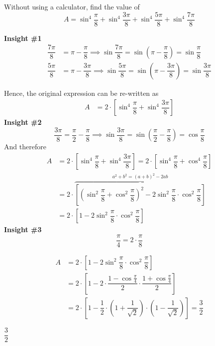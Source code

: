 
\question[4] Without using a calculator, find the value of 
\[ A = \sin^4\dfrac{\pi}{8} + \sin^4\dfrac{3\pi}{8} + \sin^4\dfrac{5\pi}{8} + \sin^4\dfrac{7\pi}{8} \]

\begin{solution}[\fullpage]
    \textbf{Insight \#1}
    \begin{align}
      \dfrac{7\pi}{8} &= \pi-\dfrac\pi{8} \implies\sin\dfrac{7\pi}{8}=\sin\left(\pi-\dfrac\pi{8} \right) = \sin\dfrac\pi{8} \\
      \dfrac{5\pi}{8} &= \pi-\dfrac{3\pi}{8} \implies\sin\dfrac{5\pi}{8}=\sin\left(\pi-\dfrac{3\pi}{8} \right) = \sin\dfrac{3\pi}{8}
    \end{align}

    Hence, the original expression can be re-written as 
    \begin{align}
      A &= 2\cdot\left[ \sin^4\dfrac\pi{8} + \sin^4\dfrac{3\pi}{8} \right] 
    \end{align}
    \textbf{Insight \#2}
    \[ \dfrac{3\pi}{8} = \dfrac\pi{2} - \dfrac\pi{8} \implies \sin\dfrac{3\pi}{8} = \sin\left(\dfrac\pi{2}-\dfrac\pi{8} \right) = \cos\dfrac\pi{8} \]
    And therefore
    \begin{align}
      A &= 2\cdot\left[ \sin^4\dfrac\pi{8} + \sin^4\dfrac{3\pi}{8} \right] 
         = 2\cdot\left[ \sin^4\dfrac\pi{8} + \cos^4\dfrac{\pi}{8} \right]  \\
        &= 2\cdot\overbrace{\left[ \left(\sin^2\dfrac\pi{8}+\cos^2\dfrac\pi{8}\right)^2 
           - 2\sin^2\dfrac\pi{8}\cdot\cos^2\dfrac\pi{8}\right]}^{a^2+b^2=(a+b)^2-2ab} \\
        &= 2\cdot\left[ 1 - 2\sin^2\dfrac\pi{8}\cdot\cos^2\dfrac\pi{8}\right]
    \end{align}
    \textbf{Insight \#3}
    \[ \dfrac\pi{4} = 2\cdot\dfrac\pi{8} \] 

    \begin{align}
        A  &= 2\cdot\left[ 1 - 2\sin^2\dfrac\pi{8}\cdot\cos^2\dfrac\pi{8}\right] \\
           &= 2\cdot\left[1 - 2\cdot\dfrac{1-\cos\frac\pi{4}}{2}\cdot\dfrac{1+\cos\frac\pi{4}}{2} \right] \\
           &= 2\cdot\left[ 1-\dfrac{1}{2}\cdot\left( 1+\dfrac{1}{\sqrt{2}} \right)\cdot\left( 1-\dfrac{1}{\sqrt{2}} \right) \right] = \dfrac{3}{2}
    \end{align}
\end{solution}

\ifprintanswers\begin{codex}$\dfrac{3}{2}$\end{codex}\fi
